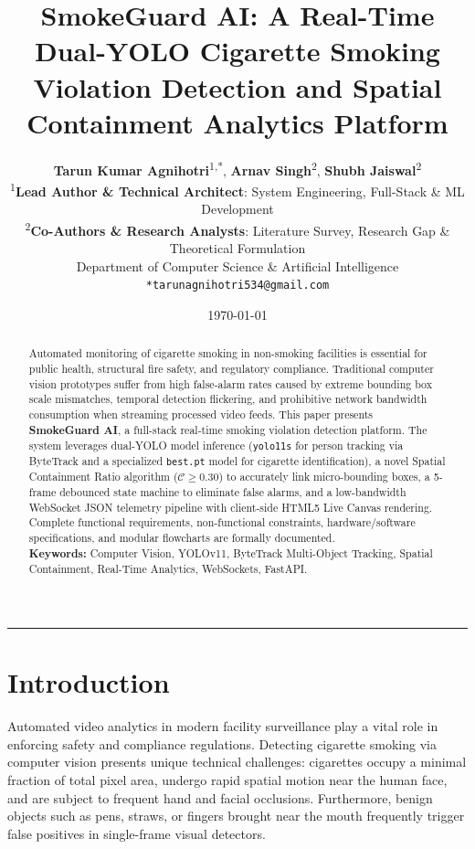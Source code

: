 \documentclass[11pt,a4paper]{article}
\title{\vspace{-0.6cm}\Large\bfseries SmokeGuard AI: A Real-Time Dual-YOLO Cigarette Smoking Violation Detection and Spatial Containment Analytics Platform}
\author{
    \textbf{Tarun Kumar Agnihotri}\textsuperscript{1,*}, \quad 
    \textbf{Arnav Singh}\textsuperscript{2}, \quad 
    \textbf{Shubh Jaiswal}\textsuperscript{2} \\[0.5em]
    \small \textsuperscript{1}\textbf{Lead Author \& Technical Architect}: System Engineering, Full-Stack \& ML Development \\
    \small \textsuperscript{2}\textbf{Co-Authors \& Research Analysts}: Literature Survey, Research Gap \& Theoretical Formulation \\[0.3em]
    \small Department of Computer Science \& Artificial Intelligence \\
    \small \texttt{*tarunagnihotri534@gmail.com}
}
\date{\today}
\begin{document}
\maketitle

\renewcommand{\abstractname}{\vspace{-0.5cm}Abstract}
\begin{abstract}
\noindent Automated monitoring of cigarette smoking in non-smoking facilities is essential for public health, structural fire safety, and regulatory compliance. Traditional computer vision prototypes suffer from high false-alarm rates caused by extreme bounding box scale mismatches, temporal detection flickering, and prohibitive network bandwidth consumption when streaming processed video feeds. This paper presents \textbf{SmokeGuard AI}, a full-stack real-time smoking violation detection platform. The system leverages dual-YOLO model inference (\texttt{yolo11s} for person tracking via ByteTrack and a specialized \texttt{best.pt} model for cigarette identification), a novel Spatial Containment Ratio algorithm ($\mathcal{C} \ge 0.30$) to accurately link micro-bounding boxes, a 5-frame debounced state machine to eliminate false alarms, and a low-bandwidth WebSocket JSON telemetry pipeline with client-side HTML5 Live Canvas rendering. Complete functional requirements, non-functional constraints, hardware/software specifications, and modular flowcharts are formally documented.
\\[0.3em]
\textbf{Keywords:} Computer Vision, YOLOv11, ByteTrack Multi-Object Tracking, Spatial Containment, Real-Time Analytics, WebSockets, FastAPI.
\end{abstract}

\hrule \vspace{0.8em}

\section{Introduction}

Automated video analytics in modern facility surveillance play a vital role in enforcing safety and compliance regulations. Detecting cigarette smoking via computer vision presents unique technical challenges: cigarettes occupy a minimal fraction of total pixel area, undergo rapid spatial motion near the human face, and are subject to frequent hand and facial occlusions. Furthermore, benign objects such as pens, straws, or fingers brought near the mouth frequently trigger false positives in single-frame visual detectors.
\end{document}

